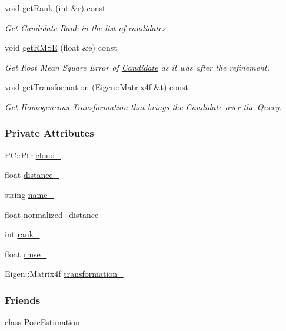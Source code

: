 \begin{DoxyCompactItemize}
void \hyperlink{classCandidate_ad66fdb55b874a43a6bd09ac64fb78931}{get\-Rank} (int \&r) const 
\begin{DoxyCompactList}\small\item\em Get \hyperlink{classCandidate}{Candidate} Rank in the list of candidates. \end{DoxyCompactList}\item 
void \hyperlink{classCandidate_a7edea7828ccbc682d177f8a060a93d8c}{get\-R\-M\-S\-E} (float \&e) const 
\begin{DoxyCompactList}\small\item\em Get Root Mean Square Error of \hyperlink{classCandidate}{Candidate} as it was after the refinement. \end{DoxyCompactList}\item 
void \hyperlink{classCandidate_ae5669e4112e92fcb119c2a06cc8904c0}{get\-Transformation} (Eigen\-::\-Matrix4f \&t) const 
\begin{DoxyCompactList}\small\item\em Get Homogeneous Transformation that brings the \hyperlink{classCandidate}{Candidate} over the Query. \end{DoxyCompactList}\end{DoxyCompactItemize}
\subsubsection*{Private Attributes}
\begin{DoxyCompactItemize}
\item 
P\-C\-::\-Ptr \hyperlink{classCandidate_a76f70de142b2d01bf2e5fa8243dd9b2f}{cloud\-\_\-}
\item 
float \hyperlink{classCandidate_a4c57f77041f7729849ff4acf86071abf}{distance\-\_\-}
\item 
string \hyperlink{classCandidate_a2d2bca2f29137c8d341202d4d4e3aa04}{name\-\_\-}
\item 
float \hyperlink{classCandidate_a03bdc19e0ee68d095ef402c1ae8857e6}{normalized\-\_\-distance\-\_\-}
\item 
int \hyperlink{classCandidate_a671df007d258250715bfa7f80df4162c}{rank\-\_\-}
\item 
float \hyperlink{classCandidate_a1794f08bfc0b49287159c85034b23654}{rmse\-\_\-}
\item 
Eigen\-::\-Matrix4f \hyperlink{classCandidate_ac6dd9ee10ce1bf011b1005cfa239cc7b}{transformation\-\_\-}
\end{DoxyCompactItemize}
\subsubsection*{Friends}
\begin{DoxyCompactItemize}
\item 
class \hyperlink{classCandidate_acc93828d970ba58835be2e8221c7a669}{Pose\-Estimation}
\end{DoxyCompactItemize}


